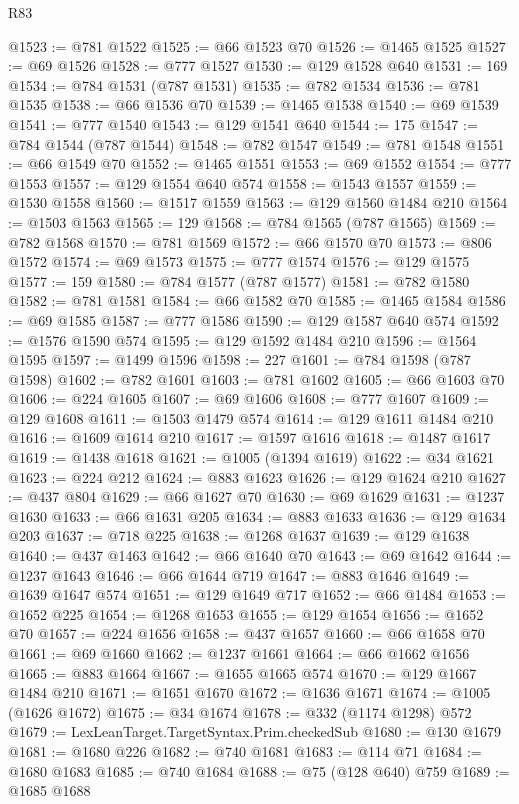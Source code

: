 \begin{lexlean}{R83}
\begin{coremodule}
@1523 := @781 @1522
@1525 := @66 @1523 @70
@1526 := @1465 @1525
@1527 := @69 @1526
@1528 := @777 @1527
@1530 := @129 @1528 @640
@1531 := 169
@1534 := @784 @1531 (@787 @1531)
@1535 := @782 @1534
@1536 := @781 @1535
@1538 := @66 @1536 @70
@1539 := @1465 @1538
@1540 := @69 @1539
@1541 := @777 @1540
@1543 := @129 @1541 @640
@1544 := 175
@1547 := @784 @1544 (@787 @1544)
@1548 := @782 @1547
@1549 := @781 @1548
@1551 := @66 @1549 @70
@1552 := @1465 @1551
@1553 := @69 @1552
@1554 := @777 @1553
@1557 := @129 @1554 @640 @574
@1558 := @1543 @1557
@1559 := @1530 @1558
@1560 := @1517 @1559
@1563 := @129 @1560 @1484 @210
@1564 := @1503 @1563
@1565 := 129
@1568 := @784 @1565 (@787 @1565)
@1569 := @782 @1568
@1570 := @781 @1569
@1572 := @66 @1570 @70
@1573 := @806 @1572
@1574 := @69 @1573
@1575 := @777 @1574
@1576 := @129 @1575
@1577 := 159
@1580 := @784 @1577 (@787 @1577)
@1581 := @782 @1580
@1582 := @781 @1581
@1584 := @66 @1582 @70
@1585 := @1465 @1584
@1586 := @69 @1585
@1587 := @777 @1586
@1590 := @129 @1587 @640 @574
@1592 := @1576 @1590 @574
@1595 := @129 @1592 @1484 @210
@1596 := @1564 @1595
@1597 := @1499 @1596
@1598 := 227
@1601 := @784 @1598 (@787 @1598)
@1602 := @782 @1601
@1603 := @781 @1602
@1605 := @66 @1603 @70
@1606 := @224 @1605
@1607 := @69 @1606
@1608 := @777 @1607
@1609 := @129 @1608
@1611 := @1503 @1479 @574
@1614 := @129 @1611 @1484 @210
@1616 := @1609 @1614 @210
@1617 := @1597 @1616
@1618 := @1487 @1617
@1619 := @1438 @1618
@1621 := @1005 (@1394 @1619)
@1622 := @34 @1621
@1623 := @224 @212
@1624 := @883 @1623
@1626 := @129 @1624 @210
@1627 := @437 @804
@1629 := @66 @1627 @70
@1630 := @69 @1629
@1631 := @1237 @1630
@1633 := @66 @1631 @205
@1634 := @883 @1633
@1636 := @129 @1634 @203
@1637 := @718 @225
@1638 := @1268 @1637
@1639 := @129 @1638
@1640 := @437 @1463
@1642 := @66 @1640 @70
@1643 := @69 @1642
@1644 := @1237 @1643
@1646 := @66 @1644 @719
@1647 := @883 @1646
@1649 := @1639 @1647 @574
@1651 := @129 @1649 @717
@1652 := @66 @1484
@1653 := @1652 @225
@1654 := @1268 @1653
@1655 := @129 @1654
@1656 := @1652 @70
@1657 := @224 @1656
@1658 := @437 @1657
@1660 := @66 @1658 @70
@1661 := @69 @1660
@1662 := @1237 @1661
@1664 := @66 @1662 @1656
@1665 := @883 @1664
@1667 := @1655 @1665 @574
@1670 := @129 @1667 @1484 @210
@1671 := @1651 @1670
@1672 := @1636 @1671
@1674 := @1005 (@1626 @1672)
@1675 := @34 @1674
@1678 := @332 (@1174 @1298) @572
@1679 := LexLeanTarget.TargetSyntax.Prim.checkedSub
@1680 := @130 @1679
@1681 := @1680 @226
@1682 := @740 @1681
@1683 := @114 @71
@1684 := @1680 @1683
@1685 := @740 @1684
@1688 := @75 (@128 @640) @759
@1689 := @1685 @1688

\end{coremodule}
\end{lexlean}
